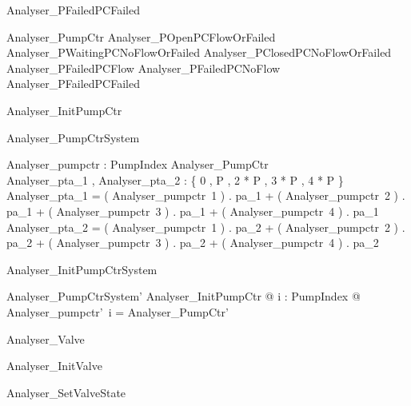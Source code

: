 \documentclass{article}
\begin{document}
\begin{zed}
	Analyser\_PFailedPCFailed 
\end{zed}

\begin{zed}
	Analyser\_PumpCtr  Analyser\_POpenPCFlowOrFailed \land Analyser\_PWaitingPCNoFlowOrFailed \land Analyser\_PClosedPCNoFlowOrFailed \land Analyser\_PFailedPCFlow \land Analyser\_PFailedPCNoFlow \land Analyser\_PFailedPCFailed
\end{zed}

\begin{zed}
	Analyser\_InitPumpCtr 
\end{zed}

\begin{schema}{Analyser\_PumpCtrSystem}

 Analyser\_pumpctr : PumpIndex \fun Analyser\_PumpCtr \\
 Analyser\_pta\_1 , Analyser\_pta\_2 : \{ 0 , P , 2 * P , 3 * P , 4 * P \} 
\where
 Analyser\_pta\_1 = ( Analyser\_pumpctr~1 ) . pa\_1 + ( Analyser\_pumpctr~2 ) . pa\_1 + ( Analyser\_pumpctr~3 ) . pa\_1 + ( Analyser\_pumpctr~4 ) . pa\_1 \\
 Analyser\_pta\_2 = ( Analyser\_pumpctr~1 ) . pa\_2 + ( Analyser\_pumpctr~2 ) . pa\_2 + ( Analyser\_pumpctr~3 ) . pa\_2 + ( Analyser\_pumpctr~4 ) . pa\_2
\end{schema}

\begin{schema}{Analyser\_InitPumpCtrSystem}

 Analyser\_PumpCtrSystem' 
\where
 \exists Analyser\_InitPumpCtr @ \forall i : PumpIndex @ Analyser\_pumpctr'~i = \theta Analyser\_PumpCtr'
\end{schema}

\begin{zed}
	Analyser\_Valve 
\end{zed}

\begin{zed}
	Analyser\_InitValve 
\end{zed}

\begin{zed}
	Analyser\_SetValveState 
\end{zed}
\end{document}
